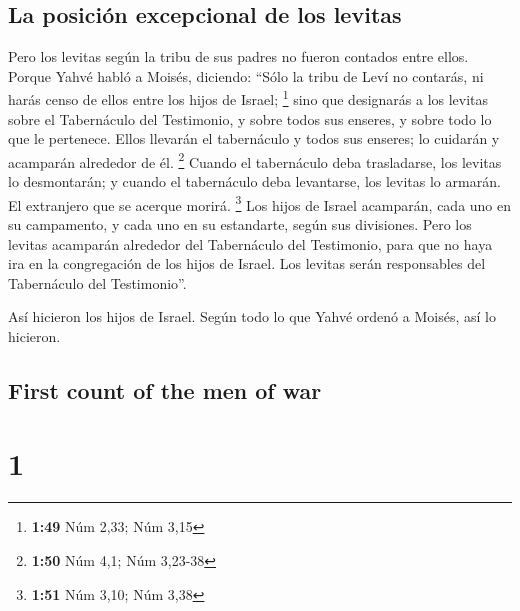 \begin{paracol}{2}
\hypertarget{la-posiciuxf3n-excepcional-de-los-levitas}{%
\subsection{La posición excepcional de los
levitas}\label{la-posiciuxf3n-excepcional-de-los-levitas}}

 Pero los levitas según la tribu de sus padres no fueron
contados entre ellos.  Porque Yahvé habló a Moisés,
diciendo:  ``Sólo la tribu de Leví no contarás, ni harás
censo de ellos entre los hijos de Israel; \footnote{\textbf{1:49} Núm
  2,33; Núm 3,15}  sino que designarás a los levitas
sobre el Tabernáculo del Testimonio, y sobre todos sus enseres, y sobre
todo lo que le pertenece. Ellos llevarán el tabernáculo y todos sus
enseres; lo cuidarán y acamparán alrededor de él. \footnote{\textbf{1:50}
  Núm 4,1; Núm 3,23-38}  Cuando el tabernáculo deba
trasladarse, los levitas lo desmontarán; y cuando el tabernáculo deba
levantarse, los levitas lo armarán. El extranjero que se acerque morirá.
\footnote{\textbf{1:51} Núm 3,10; Núm 3,38}  Los hijos de
Israel acamparán, cada uno en su campamento, y cada uno en su
estandarte, según sus divisiones.  Pero los levitas
acamparán alrededor del Tabernáculo del Testimonio, para que no haya ira
en la congregación de los hijos de Israel. Los levitas serán
responsables del Tabernáculo del Testimonio''.

 Así hicieron los hijos de Israel. Según todo lo que
Yahvé ordenó a Moisés, así lo hicieron.

\switchcolumn
\begin{otherlanguage}{english}

\hypertarget{first-count-of-the-men-of-war}{%
\subsection{First count of the men of
war}\label{first-count-of-the-men-of-war}}

\hypertarget{section-1}{%
\section{1}\label{section-1}}


\end{otherlanguage}
\end{paracol}
